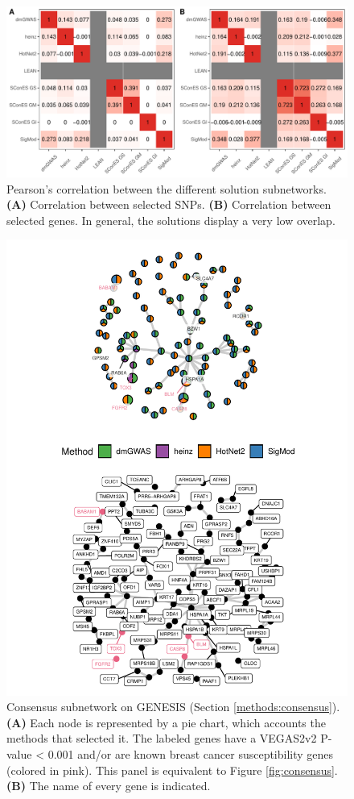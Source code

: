 \documentclass[twocolumn, 10pt]{article}
\begin{document}
\begin{figure}[htbp]
\centering
\includegraphics[width=.9\linewidth]{./figures/sfigure_6.pdf}
\caption{\label{sfig:pearson_methods}
Pearson's correlation between the different solution subnetworks. \textbf{(A)} Correlation between selected SNPs. \textbf{(B)} Correlation between selected genes. In general, the solutions display a very low overlap.}
\end{figure}

\begin{figure}[htbp]
\centering
\includegraphics[width=.9\linewidth]{./figures/sfigure_7.pdf}
\caption{\label{sfig:consensus_names}
Consensus subnetwork on GENESIS (Section \ref{methods:consensus}). \textbf{(A)} Each node is represented by a pie chart, which accounts the methods that selected it. The labeled genes have a VEGAS2v2 P-value < 0.001 and/or are known breast cancer susceptibility genes (colored in pink). This panel is equivalent to Figure \ref{fig:consensus}. \textbf{(B)} The name of every gene is indicated.}
\end{figure}
\end{document}
